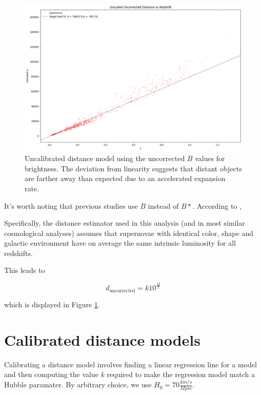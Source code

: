 \documentclass{article}
\begin{document}
\begin{figure}[h!]
  \includegraphics[width=\linewidth]{../graphs/uncorrected_uncalibrated.png}
  \caption{Uncalibrated distance model using the uncorrected $B$ values for brightness.
  The deviation from linearity suggests that distant objects are
  farther away than expected due to an accelerated expansion rate.}
  \label{fig:uncorrected_uncalibrated}
\end{figure}

It's worth noting that previous studies use $B$ instead of $B*$. According to
\citet{betoule2014},

\begin{displayquote}
  Specifically, the distance estimator used in this analysis (and in most
  similar cosmological analyses) assumes that supernovae with identical color,
  shape and galactic environment have on average the same intrinsic luminosity
  for all redshifts.
\end{displayquote}

This leads to

\begin{equation}
  d_{\text{uncorrected}} = k 10^\frac{M}{5}
\end{equation}

which is displayed in Figure \ref{fig:uncorrected_uncalibrated}.

\section{Calibrated distance models}
\label{sec:disproof}

Calibrating a distance model involves finding a linear regression line for a
model and then computing the value $k$ required to make the regression model
match a Hubble paramater. By arbitrary choice, we use $H_0 = 70 \frac{km/s}{Mpsc}$.
\end{document}
